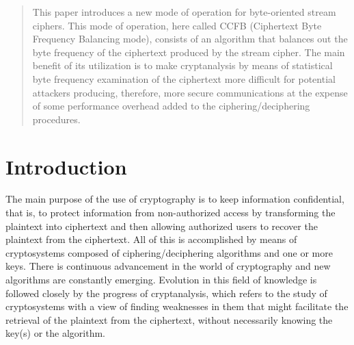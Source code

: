 \documentclass[conference]{IEEEtran}
\begin{document}




\maketitle


\begin{abstract}
This paper introduces a new mode of operation for byte-oriented stream ciphers. This mode of operation, here called CCFB (Ciphertext Byte Frequency Balancing mode), consists of an algorithm that balances out the byte frequency of the ciphertext produced by the stream cipher. The main benefit of its utilization is to make cryptanalysis by means of statistical byte frequency examination of the ciphertext more difficult for potential attackers producing, therefore, more secure communications at the expense of some performance overhead added to the ciphering/deciphering procedures.
\end{abstract}





%
\IEEEpeerreviewmaketitle



\section{Introduction}

The main purpose of the use of cryptography is to keep information confidential, that is, to protect information from non-authorized access by transforming the plaintext into ciphertext and then allowing authorized users to recover the plaintext from the ciphertext. All of this is accomplished by means of cryptosystems composed of ciphering/deciphering algorithms and one or more keys. There is continuous advancement in the world of cryptography and new algorithms are constantly emerging. Evolution in this field of knowledge is followed closely by the progress of cryptanalysis, which refers to the study of cryptosystems with a view of finding weaknesses in them that might facilitate the retrieval of the plaintext from the ciphertext, without necessarily knowing the key(s) or the algorithm.
\end{document}
